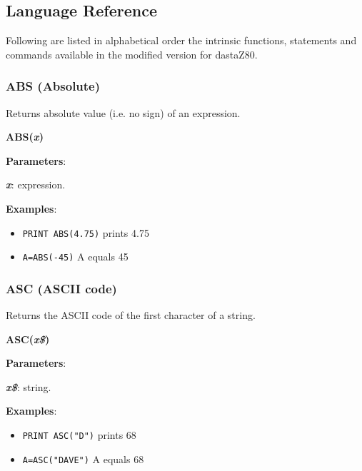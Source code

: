     \subsection{Language Reference}
    Following are listed in alphabetical order the intrinsic functions,
    statements and commands available in the modified version for dastaZ80.

    \subsubsection{{ABS (Absolute)}}
    \label{msbasic:lang:abs}
    Returns absolute value (i.e. no sign) of an expression.

    \hspace{1.9cm}\textbf{ABS(\textit{x})}

    \textbf{Parameters}:

    \hspace{1cm}\textbf{\textit{x}}: expression.

    \textbf{Examples}:
    \begin{itemize}
        \item \texttt{PRINT ABS(4.75)} prints 4.75
        \item \texttt{A=ABS(-45)} A equals 45
    \end{itemize}

    \subsubsection{{ASC (ASCII code)}}
    \label{msbasic:lang:asc}
    Returns the ASCII code of the first character of a string.

    \hspace{1.9cm}\textbf{ASC(\textit{x\$})}

    \textbf{Parameters}:

    \hspace{1cm}\textbf{\textit{x\$}}: string.

    \textbf{Examples}:
    \begin{itemize}
        \item \texttt{PRINT ASC("D")} prints 68
        \item \texttt{A=ASC("DAVE")} A equals 68
    \end{itemize}

